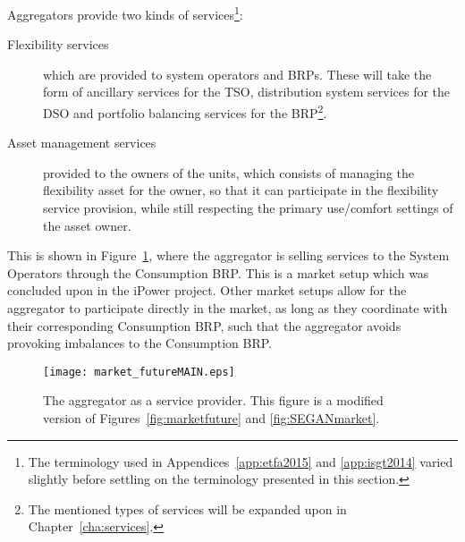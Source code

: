 Aggregators provide two kinds of services\footnote{The terminology used in Appendices~\ref{app:etfa2015} and \ref{app:isgt2014} varied slightly before settling on the terminology presented in this section.}:
\begin{description}
	\item[Flexibility services] which are provided to system operators and BRPs. These will take the form of ancillary services for the TSO, distribution system services for the DSO and portfolio balancing services for the BRP\footnote{The mentioned types of services will be expanded upon in Chapter~\ref{cha:services}.}.
	\item[Asset management services] provided to the owners of the units, which consists of managing the flexibility asset for the owner, so that it can participate in the flexibility service provision, while still respecting the primary use/comfort settings of the asset owner.
\end{description}
This is shown in Figure~\ref{fig:market_futureMAIN}, where the aggregator is selling services to the System Operators through the Consumption BRP. This is a market setup which was concluded upon in the iPower project. Other market setups allow for the aggregator to participate directly in the market, as long as they coordinate with their corresponding Consumption BRP, such that the aggregator avoids provoking imbalances to the Consumption BRP.
\begin{figure}[htbp!]
\centering
\texttt{[image: market\_futureMAIN.eps]}
\caption{The aggregator as a service provider. This figure is a modified version of Figures~\ref{fig:marketfuture} and \ref{fig:SEGANmarket}.}
\label{fig:market_futureMAIN}
\end{figure}

